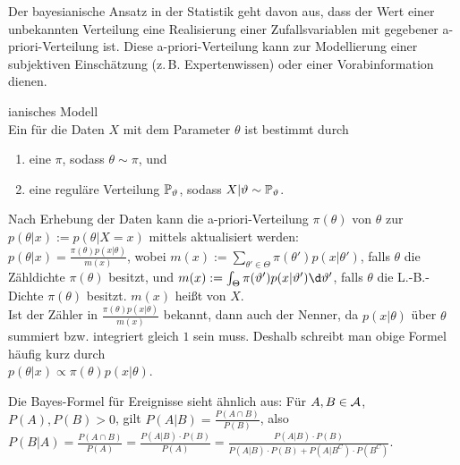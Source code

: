 \begin{Bem}
    Der bayesianische Ansatz in der Statistik geht davon aus, dass der Wert einer unbekannten
    Verteilung eine Realisierung einer Zufallsvariablen mit gegebener
    a-priori-Verteilung ist.
    Diese a-priori-Verteilung kann zur Modellierung einer subjektiven Einschätzung
    (z.\,B. Expertenwissen) oder einer Vorabinformation dienen.
\end{Bem}

\begin{Def}{ianisches Modell}\\
    Ein  für die Daten $X$ mit dem Parameter $\theta$
    ist bestimmt durch
    \begin{enumerate}
        \item
        eine  $\pi$, sodass $\theta \sim \pi$, und
        
        \item
        eine reguläre Verteilung $\mathbb{P}_\vartheta$, sodass $X|\vartheta \sim \mathbb{P}_\vartheta$.
    \end{enumerate}
\end{Def}

\linie

\begin{Bem}
    Nach Erhebung der Daten kann die a-priori-Verteilung $\pi(\theta)$ von $\theta$
    zur  $p(\theta|x) := p(\theta|X=x)$ mittels
     aktualisiert werden:\\
    $p(\theta|x) = \frac{\pi(\theta) p(x|\theta)}{m(x)}$,
    wobei $m(x) := \sum_{\theta' \in \Theta} \pi(\theta') p(x|\theta')$, falls $\theta$ die
    Zähldichte $\pi(\theta)$ besitzt, und
    $m(x) := \int_\Theta \pi(\theta') p(x|\theta') \d\theta'$, falls $\theta$ die L.-B.-Dichte
    $\pi(\theta)$ besitzt.
    $m(x)$ heißt  von $X$.\\
    Ist der Zähler in $\frac{\pi(\theta) p(x|\theta)}{m(x)}$ bekannt, dann auch der Nenner,
    da $p(x|\theta)$ über $\theta$ summiert bzw. integriert gleich $1$ sein muss.
    Deshalb schreibt man obige Formel häufig kurz durch\\
    $p(\theta|x) \propto \pi(\theta) p(x|\theta)$.
\end{Bem}

\begin{Bem}
    Die Bayes-Formel für Ereignisse sieht ähnlich aus:
    Für $A, B \in \mathcal{A}$, $P(A), P(B) > 0$, gilt
    $P(A|B) = \frac{P(A \cap B)}{P(B)}$, also
    $P(B|A) = \frac{P(A \cap B)}{P(A)} = \frac{P(A|B) \cdot P(B)}{P(A)} =
    \frac{P(A|B) \cdot P(B)}{P(A|B) \cdot P(B) + P(A|B^C) \cdot P(B^C)}$.
\end{Bem}


